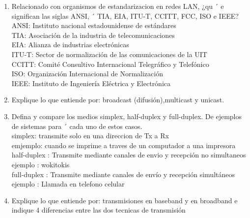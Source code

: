 \documentclass{udparticle}
\begin{document}
\begin{enumerate}
\itemIndique En que capas del modelo OSI las unidades de datos de los protocolos se llaman segmento,
frame, paquete y bits.\\
    REVISEN ESTO NO ESTOY MUY SEGURO D:
  Física -> Bits\\
  Enlace de red -> Paquete\\
  Red -> Frame\\
  Transporte -> Segmento\\

\item Relacionado con organismos de estandarizacion en redes LAN, ¿qu ´ e significan las siglas ANSI, ´
TIA, EIA, ITU-T, CCITT, FCC, ISO e IEEE?\\

    ANSI: Instituto nacional estadounidense de estándares\\
    TIA: Asociación de la industria de telecomunicaciones\\
    EIA: Alianza de industrias electrónicas\\
    ITU-T: Sector de normalización de las comunicaciones de la UIT\\
    CCITT: Comité Consultivo Internacional Telegráfico y Telefónico\\
    ISO: Organización Internacional de Normalización\\
    IEEE: Instituto de Ingeniería Eléctrica y Electrónica\\

\item Explique lo que entiende por: broadcast (difusión),multicast y unicast.\\

\item Defina y compare los medios simplex, half-duplex y full-duplex. De ejemplos de sistemas para ´
cada uno de estos casos.\\
    simplex: transmite solo en una direccion de Tx a Rx\\
        emjemplo: cuando se imprime a traves de un computador a una impresora\\
    half-duplex : Transmite mediante canales de envio y recepción no simultaneos\\
        ejemplo : wokitokis\\
    full-duplex : Transmite mediante  canales de envío y recepción simultáneos\\
        ejemplo : Llamada en telefono celular\\
        
\item Explique lo que entiende por: transmisiones en baseband y en broadband e indique 4 diferencias
entre las dos tecnicas de transmisión\\


\end{enumerate}
\end{document}
